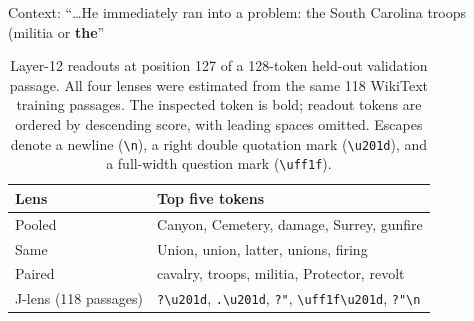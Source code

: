 \documentclass[10pt,oneside,reqno]{amsart}
\theoremstyle{definition}
\numberwithin{equation}{section}
\begin{document}
\begin{table}[H]
\centering
\small

\begin{minipage}{0.95\linewidth}
Context: ``\ldots He immediately ran into a problem:
the South Carolina troops (militia or \textbf{the}''
\end{minipage}

\medskip
\begin{tabularx}{\linewidth}{lX}
\toprule
Lens & Top five tokens \\
\midrule
Pooled & Canyon, Cemetery, damage, Surrey, gunfire \\
Same   & Union, union, latter, unions, firing \\
Paired & cavalry, troops, militia, Protector, revolt \\
J-lens (118 passages) &
\texttt{?\textbackslash u201d},
\texttt{.\textbackslash u201d},
\texttt{?"},
\texttt{\textbackslash uff1f\textbackslash u201d},
\texttt{?"\textbackslash n} \\
\bottomrule
\end{tabularx}

\caption{Layer-12 readouts at position 127 of a 128-token
held-out validation passage. All four lenses were estimated
from the same 118 WikiText training passages.
The inspected token is bold; readout tokens are ordered by
descending score, with leading spaces omitted.
Escapes denote a newline (\texttt{\textbackslash n}),
a right double quotation mark (\texttt{\textbackslash u201d}),
and a full-width question mark (\texttt{\textbackslash uff1f}).}
\label{tab:readout-military}
\end{table}
\end{document}
